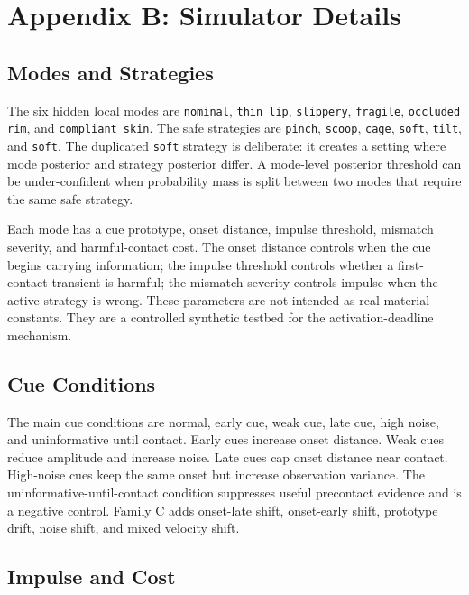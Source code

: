 \documentclass{article}
\begin{document}
\section{Appendix B: Simulator Details}

\subsection{Modes and Strategies}

The six hidden local modes are \texttt{nominal}, \texttt{thin lip}, \texttt{slippery}, \texttt{fragile}, \texttt{occluded rim}, and \texttt{compliant skin}. The safe strategies are \texttt{pinch}, \texttt{scoop}, \texttt{cage}, \texttt{soft}, \texttt{tilt}, and \texttt{soft}. The duplicated \texttt{soft} strategy is deliberate: it creates a setting where mode posterior and strategy posterior differ. A mode-level posterior threshold can be under-confident when probability mass is split between two modes that require the same safe strategy.

Each mode has a cue prototype, onset distance, impulse threshold, mismatch severity, and harmful-contact cost. The onset distance controls when the cue begins carrying information; the impulse threshold controls whether a first-contact transient is harmful; the mismatch severity controls impulse when the active strategy is wrong. These parameters are not intended as real material constants. They are a controlled synthetic testbed for the activation-deadline mechanism.

\subsection{Cue Conditions}

The main cue conditions are normal, early cue, weak cue, late cue, high noise, and uninformative until contact. Early cues increase onset distance. Weak cues reduce amplitude and increase noise. Late cues cap onset distance near contact. High-noise cues keep the same onset but increase observation variance. The uninformative-until-contact condition suppresses useful precontact evidence and is a negative control. Family C adds onset-late shift, onset-early shift, prototype drift, noise shift, and mixed velocity shift.

\subsection{Impulse and Cost}
\end{document}
